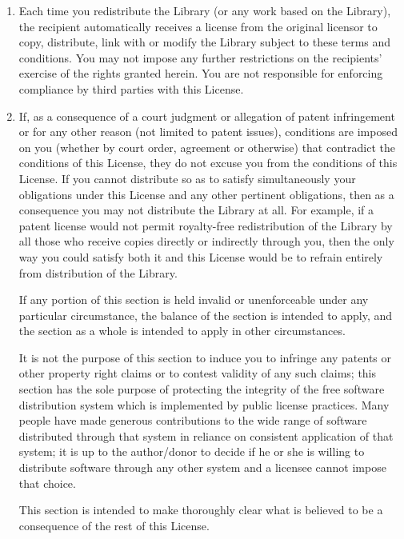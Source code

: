 \documentclass[12pt]{report}
\begin{document}
\begin{enumerate}
\item

  Each time you redistribute the Library (or any work based on the
  Library), the recipient automatically receives a license from the
  original licensor to copy, distribute, link with or modify the Library
  subject to these terms and conditions.  You may not impose any further
  restrictions on the recipients' exercise of the rights granted herein.
  You are not responsible for enforcing compliance by third parties with
  this License.

\item

  If, as a consequence of a court judgment or allegation of patent
  infringement or for any other reason (not limited to patent issues),
  conditions are imposed on you (whether by court order, agreement or
  otherwise) that contradict the conditions of this License, they do not
  excuse you from the conditions of this License.  If you cannot
  distribute so as to satisfy simultaneously your obligations under this
  License and any other pertinent obligations, then as a consequence you
  may not distribute the Library at all.  For example, if a patent license
  would not permit royalty-free redistribution of the Library by all those
  who receive copies directly or indirectly through you, then the only way
  you could satisfy both it and this License would be to refrain entirely
  from distribution of the Library.

  If any portion of this section is held invalid or unenforceable under
  any particular circumstance, the balance of the section is intended to
  apply, and the section as a whole is intended to apply in other
  circumstances.

  It is not the purpose of this section to induce you to infringe any
  patents or other property right claims or to contest validity of any
  such claims; this section has the sole purpose of protecting the
  integrity of the free software distribution system which is implemented
  by public license practices.  Many people have made generous
  contributions to the wide range of software distributed through that
  system in reliance on consistent application of that system; it is up to
  the author/donor to decide if he or she is willing to distribute
  software through any other system and a licensee cannot impose that
  choice.

  This section is intended to make thoroughly clear what is believed to be
  a consequence of the rest of this License.


\end{enumerate}
\end{document}
